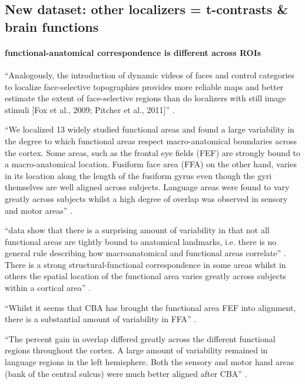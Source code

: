 \subsection{New dataset: other localizers = t-contrasts \& brain functions}

\paragraph{functional-anatomical correspondence is different across ROIs}

%
``Analogously, the introduction of dynamic videos of faces and control
categories to localize face-selective topographies provides more reliable maps
and better estimate the extent of face-selective regions than do localizers with
still image stimuli [Fox et al., 2009; Pitcher et al., 2011]''
\citep{jiahui2020predicting}.

``We localized 13 widely studied functional areas and found a large variability
in the degree to which functional areas respect macro-anatomical boundaries
across the cortex.
%
Some areas, such as the frontal eye fields (FEF) are strongly bound to a
macro-anatomical location.
%
Fusiform face area (FFA) on the other hand, varies in its location along the
length of the fusiform gyrus even though the gyri themselves are well aligned
across subjects.
%
Language areas were found to vary greatly across subjects whilst a high degree
of overlap was observed in sensory and motor areas'' \citep{frost2012measuring}.

``data show that there is a surprising amount of variability in that not all
functional areas are tightly bound to anatomical landmarks, i.e. there is no
general rule describing how macroanatomical and functional areas correlate''
\citep{frost2012measuring}.
%
There is a strong structural-functional correspondence in some areas whilst in
others the spatial location of the functional area varies greatly across
subjects within a cortical area'' \citep{frost2012measuring}.

``Whilst it seems that CBA has brought the functional area FEF into alignment,
there is a substantial amount of variability in FFA''
\citep{frost2012measuring}.

``The percent gain in overlap differed greatly across the different functional
regions throughout the cortex.
%
A large amount of variability remained in language regions in the left
hemisphere.
%
Both the sensory and motor hand areas (bank of the central sulcus) were much
better aligned after CBA'' \citep{frost2012measuring}.

